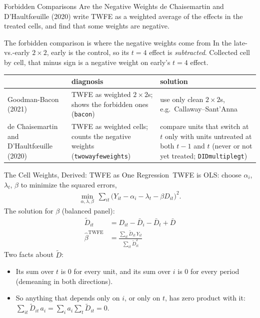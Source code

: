\documentclass[aspectratio=169,11pt,xcolor=dvipsnames]{beamer}
\newcommand{\srct}[1]{#1}
\newcommand{\adv}{\,\raisebox{0.6pt}{\textcolor{accent}{$\bigstar$}}}
\begin{document}
\begin{frame}{Forbidden Comparisons Are the Negative Weights}
\srct{de Chaisemartin and D'Haultf\oe uille (2020)} write TWFE as a weighted average of the
effects in the treated cells, and find that some weights are \alert{negative}.
\vskip6pt
\begin{alertblock}{The forbidden comparison is where the negative weights come from}
In the late-vs.-early $2\times2$, early is the control, so its $t = 4$ effect is
\emph{subtracted}. Collected cell by cell, that minus sign is a negative weight on early's
$t = 4$ effect.
\end{alertblock}
\vskip4pt
\begin{center}\footnotesize
\renewcommand{\arraystretch}{1.2}
\begin{tabular}{@{}>{\raggedright\arraybackslash}p{2.8cm}>{\raggedright\arraybackslash}p{3.9cm}>{\raggedright\arraybackslash}p{4.2cm}@{}}
\toprule
 & diagnosis & solution \\
\midrule
Goodman-Bacon (2021) & TWFE as weighted $2\times2$s; shows the forbidden ones (\texttt{bacon}) & use only clean $2\times2$s, e.g.\ Callaway--Sant'Anna \\
de Chaisemartin and D'Haultf\oe uille (2020) & TWFE as weighted cells; counts the negative weights (\texttt{twowayfeweights}) & compare units that switch at $t$ only with units untreated at both $t-1$ and $t$ (never or not yet treated; \texttt{DIDmultiplegt}) \\
\bottomrule
\end{tabular}
\end{center}
\end{frame}

\begin{frame}{The Cell Weights, Derived: TWFE as One Regression\adv}
TWFE is OLS: choose $\alpha_i$, $\lambda_t$, $\beta$ to minimize the squared errors,
\begin{align*}
  \min_{\alpha, \lambda, \beta}\ \sum_{it}\big(Y_{it} - \alpha_i - \lambda_t - \beta D_{it}\big)^2 .
\end{align*}
The solution for $\beta$ (balanced panel):
\begin{align*}
  \tilde D_{it} &= D_{it} - \bar D_i - \bar D_t + \bar D \\
  \hat\beta^{\text{TWFE}} &= \frac{\sum_{it} \tilde D_{it}\, Y_{it}}{\sum_{it} \tilde D_{it}^2}
\end{align*}
\vskip2pt
Two facts about $\tilde D$:
\begin{itemize}\itemsep3pt
  \item Its sum over $t$ is 0 for every unit, and its sum over $i$ is 0 for every period
        (demeaning in both directions).
  \item So anything that depends only on $i$, or only on $t$, has zero product with it:
        $\sum_{it}\tilde D_{it}\,a_i = \sum_i a_i \sum_t \tilde D_{it} = 0$.
\end{itemize}
\end{frame}
\end{document}
